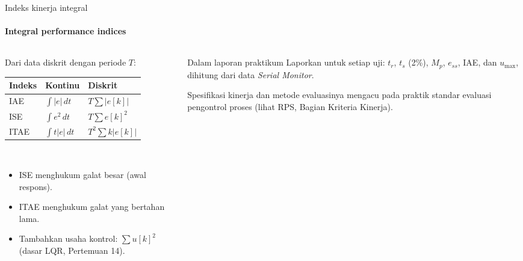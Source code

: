\documentclass[aspectratio=169,10pt]{beamer}
\begin{document}
\begin{frame}{Indeks kinerja integral}
	\framesubtitle{Integral performance indices}
	\begin{columns}[T]
		\begin{column}{0.52\textwidth}
			\small
			Dari data diskrit dengan periode $T$:
			\renewcommand{\arraystretch}{1.6}
			\begin{tabular}{@{}l l l@{}}
				\toprule
				Indeks & Kontinu & Diskrit \\
				\midrule
				IAE & $\int |e|\,dt$ & $T\sum |e[k]|$ \\
				ISE & $\int e^2\,dt$ & $T\sum e[k]^2$ \\
				ITAE & $\int t|e|\,dt$ & $T^2\sum k|e[k]|$ \\
				\bottomrule
			\end{tabular}\\[4pt]
			\begin{itemize}
				\item ISE menghukum galat besar (awal respons).
				\item ITAE menghukum galat yang bertahan lama.
				\item Tambahkan usaha kontrol: $\sum u[k]^2$ (dasar LQR, Pertemuan 14).
			\end{itemize}
		\end{column}
		\begin{column}{0.44\textwidth}
			\begin{block}{Dalam laporan praktikum}
				\small
				Laporkan untuk setiap uji: $t_r$, $t_s$ (2\%), $M_p$, $e_{ss}$, IAE, dan $u_{\max}$, dihitung dari data \textit{Serial Monitor}.
			\end{block}
			\vspace{0.1cm}
			{\small Spesifikasi kinerja dan metode evaluasinya mengacu pada praktik standar evaluasi pengontrol proses (lihat RPS, Bagian Kriteria Kinerja).}
		\end{column}
	\end{columns}
\end{frame}
\end{document}
